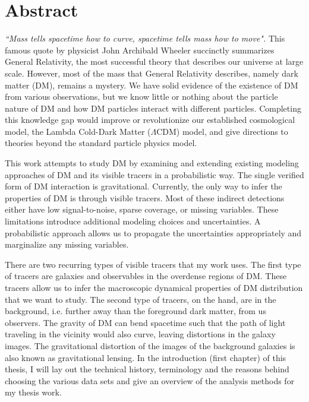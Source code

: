 \documentclass[ucdthesis.tex]{subfiles}
\begin{document}

    \doublespacing
		\section*{Abstract} 

		{\it ``Mass tells spacetime how to curve, spacetime tells mass how to move".}
		This famous quote by physicist John Archibald Wheeler succinctly summarizes General
		Relativity,  the most successful theory that describes our universe
		at large scale. However, most of the mass that General Relativity describes,
		namely dark matter (DM), remains a mystery.  
		We have solid evidence of the existence of DM from various
		observations, but we know little or nothing about the particle nature of DM
		and how DM particles interact with different particles. 
		Completing this knowledge gap would improve or 
		revolutionize our established cosmological model,
		the Lambda Cold-Dark Matter	($\Lambda$CDM) model, 
		and give directions to theories beyond the standard particle
		physics model. 

			This work attempts to study DM by examining and
		extending existing modeling approaches of DM and its visible tracers in a
		probabilistic way. The single verified form of 
		DM interaction is gravitational. Currently, the 
		only way to infer the properties of DM is through visible tracers. Most of 
		these indirect detections	either have low signal-to-noise, sparse coverage, 
		or missing
		variables. These limitations introduce additional
		modeling choices and uncertainties. A probabilistic approach allows us to
		propagate the uncertainties appropriately and marginalize any 
		missing variables. 	
		
		There are two recurring types of visible tracers that 
		my work uses. The first type of tracers are galaxies and observables in the 
		 overdense regions of DM. These tracers allow 
		us to infer the macroscopic dynamical properties of DM distribution that we want to study. The
		second type of tracers, on the hand, are in the background, i.e.
		further away than the foreground dark matter, from us observers. The
		gravity of DM can bend spacetime such that the path of light traveling in 
		the vicinity would also curve, leaving distortions in the galaxy images. 
		The gravitational distortion of the images 
		of the background galaxies is also known as gravitational lensing. In the
		introduction (first chapter) of this thesis, I will lay out the technical
		history, terminology and the reasons behind choosing the various data sets
		and give an overview of the analysis methods for my thesis work. 
		
\end{document}
